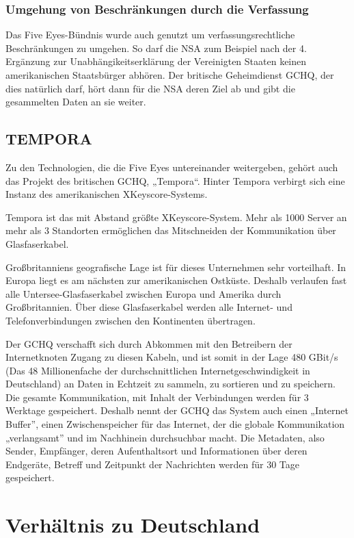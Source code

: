 \documentclass[12pt,a4paper]{scrartcl}
\begin{document}
\subsubsection{Umgehung von Beschränkungen durch die Verfassung}
Das Five Eyes-Bündnis wurde auch genutzt um verfassungsrechtliche Beschränkungen zu umgehen. So darf die NSA zum Beispiel nach der 4. Ergänzung zur Unabhängikeitserklärung der Vereinigten Staaten keinen amerikanischen Staatsbürger abhören. Der britische Geheimdienst GCHQ, der dies natürlich darf, hört dann für die NSA deren Ziel ab und gibt die gesammelten Daten an sie weiter.

\subsection{TEMPORA}
Zu den Technologien, die die Five Eyes untereinander weitergeben, gehört auch das Projekt des britischen GCHQ, „Tempora“. Hinter Tempora verbirgt sich eine Instanz des amerikanischen XKeyscore-Systems.

Tempora ist das mit Abstand größte XKeyscore-System. Mehr als 1000 Server an mehr als 3 Standorten ermöglichen das Mitschneiden der Kommunikation über Glasfaserkabel.

Großbritanniens geografische Lage ist für dieses Unternehmen sehr vorteilhaft. In Europa liegt es am nächsten zur amerikanischen Ostküste. Deshalb verlaufen fast alle Untersee-Glasfaserkabel zwischen Europa und Amerika durch Großbritannien. Über diese Glasfaserkabel werden alle Internet- und Telefonverbindungen zwischen den Kontinenten übertragen.

Der GCHQ verschafft sich durch Abkommen mit den Betreibern der Internetknoten Zugang zu diesen Kabeln, und ist somit in der Lage 480 GBit/s (Das 48 Millionenfache der durchschnittlichen Internetgeschwindigkeit in Deutschland\cite{statista_internet}) an Daten in Echtzeit zu sammeln, zu sortieren und zu speichern. Die gesamte Kommunikation, mit Inhalt der Verbindungen werden für 3 Werktage gespeichert. Deshalb nennt der GCHQ das System auch einen „Internet Buffer”, einen Zwischenspeicher für das Internet, der die globale Kommunikation „verlangsamt” und im Nachhinein durchsuchbar macht. Die Metadaten, also Sender, Empfänger, deren Aufenthaltsort und Informationen über deren Endgeräte, Betreff und Zeitpunkt der Nachrichten werden für 30 Tage gespeichert.

\section{Verhältnis zu Deutschland}
\end{document}
